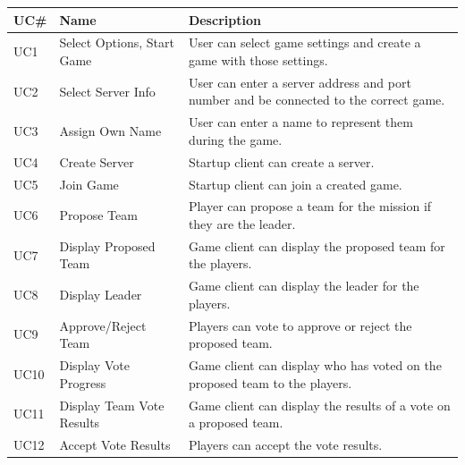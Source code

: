 \documentclass{hitec}
\begin{document}
\begin{longtable}{l|l| p{6cm}}
\textbf{UC\#} & \textbf{Name}                 & \textbf{Description}                                                                                     \\
\hline
UC1           & Select Options, Start Game    & User can select game settings and create a game with those settings.                                     \\
UC2           & Select Server Info            & User can enter a server address and port number and be connected to the correct game.                    \\
UC3           & Assign Own Name               & User can enter a name to represent them during the game.                                                 \\
UC4           & Create Server                 & Startup client can create a server.                                                                      \\
UC5           & Join Game                     & Startup client can join a created game.                                                                  \\
UC6           & Propose Team                  & Player can propose a team for the mission if they are the leader.                                        \\
UC7           & Display Proposed Team         & Game client can display the proposed team for the players.                                               \\
UC8           & Display Leader                & Game client can display the leader for the players.                                                      \\
UC9           & Approve/Reject Team           & Players can vote to approve or reject the proposed team.                                                 \\
UC10          & Display Vote Progress         & Game client can display who has voted on the proposed team to the players.                               \\
UC11          & Display Team Vote Results     & Game client can display the results of a vote on a proposed team.                                        \\
UC12          & Accept Vote Results           & Players can accept the vote results.                                                                     \\

\end{longtable}
\end{document}

